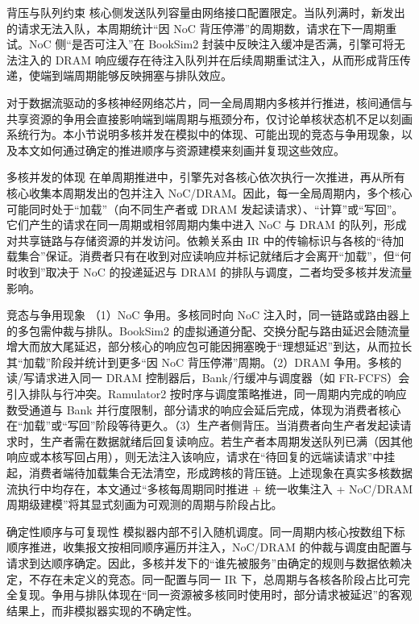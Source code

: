 背压与队列约束  核心侧发送队列容量由网络接口配置限定。当队列满时，新发出的请求无法入队，本周期统计“因 NoC 背压停滞”的周期数，请求在下一周期重试。NoC 侧“是否可注入”在 BookSim2 封装中反映注入缓冲是否满，引擎可将无法注入的 DRAM 响应缓存在待注入队列并在后续周期重试注入，从而形成背压传递，使端到端周期能够反映拥塞与排队效应。


对于数据流驱动的多核神经网络芯片，同一全局周期内多核并行推进，核间通信与共享资源的争用会直接影响端到端周期与瓶颈分布，仅讨论单核状态机不足以刻画系统行为。本小节说明多核并发在模拟中的体现、可能出现的竞态与争用现象，以及本文如何通过确定的推进顺序与资源建模来刻画并复现这些效应。

多核并发的体现  在单周期推进中，引擎先对各核心依次执行一次推进，再从所有核心收集本周期发出的包并注入 NoC/DRAM。因此，每一全局周期内，多个核心可能同时处于“加载”（向不同生产者或 DRAM 发起读请求）、“计算”或“写回”。它们产生的请求在同一周期或相邻周期内集中进入 NoC 与 DRAM 的队列，形成对共享链路与存储资源的并发访问。依赖关系由 IR 中的传输标识与各核的“待加载集合”保证。消费者只有在收到对应读响应并标记就绪后才会离开“加载”，但“何时收到”取决于 NoC 的投递延迟与 DRAM 的排队与调度，二者均受多核并发流量影响。

竞态与争用现象  （1）NoC 争用。多核同时向 NoC 注入时，同一链路或路由器上的多包需仲裁与排队。BookSim2 的虚拟通道分配、交换分配与路由延迟会随流量增大而放大尾延迟，部分核心的响应包可能因拥塞晚于“理想延迟”到达，从而拉长其“加载”阶段并统计到更多“因 NoC 背压停滞”周期。（2）DRAM 争用。多核的读/写请求进入同一 DRAM 控制器后，Bank/行缓冲与调度器（如 FR-FCFS）会引入排队与行冲突。Ramulator2 按时序与调度策略推进，同一周期内完成的响应数受通道与 Bank 并行度限制，部分请求的响应会延后完成，体现为消费者核心在“加载”或“写回”阶段等待更久。（3）生产者侧背压。当消费者向生产者发起读请求时，生产者需在数据就绪后回复读响应。若生产者本周期发送队列已满（因其他响应或本核写回占用），则无法注入该响应，请求在“待回复的远端读请求”中挂起，消费者端待加载集合无法清空，形成跨核的背压链。上述现象在真实多核数据流执行中均存在，本文通过“多核每周期同时推进 + 统一收集注入 + NoC/DRAM 周期级建模”将其显式刻画为可观测的周期与阶段占比。

确定性顺序与可复现性  模拟器内部不引入随机调度。同一周期内核心按数组下标顺序推进，收集报文按相同顺序遍历并注入，NoC/DRAM 的仲裁与调度由配置与请求到达顺序确定。因此，多核并发下的“谁先被服务”由确定的规则与数据依赖决定，不存在未定义的竞态。同一配置与同一 IR 下，总周期与各核各阶段占比可完全复现。争用与排队体现在“同一资源被多核同时使用时，部分请求被延迟”的客观结果上，而非模拟器实现的不确定性。

